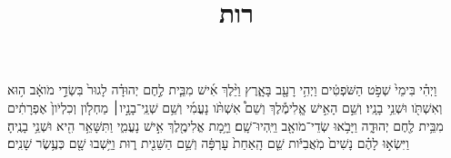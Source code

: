 \documentclass{openreader}
\title{רות}
\date{}
\begin{document}
\maketitle
\raggedbottom 
\fontsize{16pt}{24pt}\selectfont


וַיְהִ֗י בִּימֵי֙ שְׁפֹ֣ט הַשֹּׁפְטִ֔ים וַיְהִ֥י רָעָ֖ב בָּאָ֑רֶץ וַיֵּ֨לֶךְ אִ֜ישׁ מִבֵּ֧ית לֶ֣חֶם יְהוּדָ֗ה לָגוּר֙ בִּשְׂדֵ֣י מֹואָ֔ב ה֥וּא וְאִשְׁתֹּ֖ו וּשְׁנֵ֥י בָנָֽיו׃ 
וְשֵׁ֣ם הָאִ֣ישׁ אֱֽלִימֶ֡לֶךְ וְשֵׁם֩ אִשְׁתֹּ֨ו נָעֳמִ֜י וְשֵׁ֥ם שְׁנֵֽי־בָנָ֣יו׀ מַחְלֹ֤ון וְכִלְיֹון֙ אֶפְרָתִ֔ים מִבֵּ֥ית לֶ֖חֶם יְהוּדָ֑ה וַיָּבֹ֥אוּ שְׂדֵי־מֹואָ֖ב וַיִּֽהְיוּ־שָֽׁם׃ 
וַיָּ֥מָת אֱלִימֶ֖לֶךְ אִ֣ישׁ נָעֳמִ֑י וַתִּשָּׁאֵ֥ר הִ֖יא וּשְׁנֵ֥י בָנֶֽיהָ׃ 
וַיִּשְׂא֣וּ לָהֶ֗ם נָשִׁים֙ מֹֽאֲבִיֹּ֔ות שֵׁ֤ם הָֽאַחַת֙ עָרְפָּ֔ה וְשֵׁ֥ם הַשֵּׁנִ֖ית ר֑וּת וַיֵּ֥שְׁבוּ שָׁ֖ם כְּעֶ֥שֶׂר שָׁנִֽים׃ 
\end{document}
